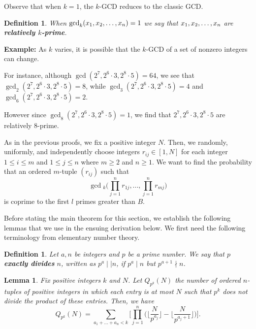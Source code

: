 \documentclass[12pt]{amsart}
\newtheorem{lemma}[theorem]{Lemma}
\newtheorem{definition}[theorem]{Definition}
\theoremstyle{definition}
\begin{document}
\noindent Observe that when $k=1$, the $k$-GCD reduces to the classic GCD.

\begin{definition} When $\gcd_k(x_1,x_2,\mathellipsis,x_n)=1$ we say that  $x_1,x_2,\mathellipsis,x_n$ are \textbf{relatively $k$-prime}.
\end{definition}

\noindent \textbf{Example:}
As $k$ varies, it is possible that the $k$-GCD of a set of nonzero integers can change. 

\noindent For instance, although $\gcd(2^7, 2^6 \cdot 3, 2^8 \cdot 5) = 64$, we see that $\gcd_2(2^7, 2^6 \cdot 3, 2^8 \cdot 5)=8$, while $\gcd_3(2^7, 2^6 \cdot 3, 2^8 \cdot 5)=4$ and $\gcd_6(2^7, 2^6 \cdot 3, 2^8 \cdot 5) = 2$. 

\noindent However since $\gcd_8(2^7, 2^6 \cdot 3, 2^8 \cdot 5) = 1$, we find that $2^7, 2^6 \cdot 3, 2^8 \cdot 5$ are relatively $8$-prime.

As in the previous proofs, we fix a positive integer $N$. Then, we randomly, uniformly, and independently choose integers $r_{ij} \in [1, N]$ for each integer $1 \leq i \leq m$ and $1 \leq j \leq n$ where $m \geq 2$ and $n \geq 1$. We want to find the probability that an ordered $m$-tuple $(r_{ij})$ such that 
$$\gcd{}_k\Big(\prod_{j=1}^nr_{1j}, ..., \prod_{j=1}^n r_{mj}\Big)$$
is coprime to the first $l$ primes greater than $B$. 

Before stating the main theorem for this section, we establish the following lemmas that we use in the ensuing derivation below. We first need the following terminology from elementary number theory.

\begin{definition}
	Let $a, n$ be integers and $p$ be a prime number. We say that $p$ \textbf{exactly divides} $n$, written as $p^a \mid \mid n$, if $p^a \mid n$ but $p^{a+1} \nmid n$. 
\end{definition}

\begin{lemma}
	Fix positive integers $k$ and $N$. Let $Q_{p^k}(N)$ the number of ordered $n$-tuples of positive integers in which each entry is at most $N$ such that $p^k$ does not divide the product of these entries. Then, we have
	$$Q_{p^k}(N) = \sum_{a_1+...+a_n < k} \Big[\prod_{j=1}^n \Big(\Big\lfloor \frac{N}{p^{a_j}}\Big\rfloor - \Big\lfloor \frac{N}{p^{a_j + 1}}\Big\rfloor\Big)\Big].$$
\end{lemma}
\end{document}
